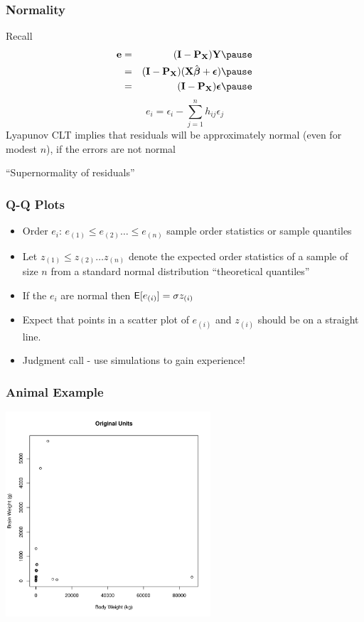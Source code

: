 \documentclass[handout]{beamer}
\begin{document}
\begin{frame}
    \frametitle{Normality}
    Recall
    \begin{eqnarray*}
 \e & = &(\I - \P_\X) \Y \pause \\      
 & = & (\I - \P_\X)(\X \bhat + \eps)  \pause\\
 & = &  (\I - \P_\X)\eps  \pause
    \end{eqnarray*}
$$e_i = \epsilon_i - \sum_{j=1}^n h_{ij} \epsilon_j$$  \pause
Lyapunov CLT implies that  residuals will be approximately normal
(even for modest $n$), 
if the errors are not normal  \pause

\vfill

``Supernormality of residuals''
  \end{frame}
  \begin{frame}
    \frametitle{Q-Q Plots}
\begin{itemize}
\item Order $e_i$: $e_{(1)} \le e_{(2)} \ldots \le e_{(n)}$  sample
    order statistics or sample quantiles  \pause
\item Let $z_{(1)} \le z_{(2)} \ldots z_{(n)}$ denote the expected
  order statistics of a sample of size $n$ from a standard normal
  distribution ``theoretical quantiles''  \pause
\item If the $e_i$ are normal then $\textsf{E}[e_{(i)}] = \sigma z_{(i)}$   \pause
\item Expect that points in a scatter plot of $e_{(i)}$ and $z_{(i)}$
  should be on a straight line.  \pause
\item Judgment call - use simulations to gain experience!
\end{itemize}
    
  \end{frame}

  \begin{frame}
    \frametitle{Animal Example}

\centerline{\includegraphics[height=3in]{brain}}
  \end{frame}
\end{document}
